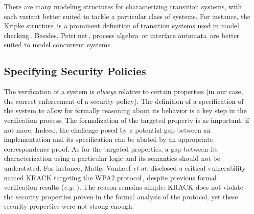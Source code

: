 There are many modeling structures for characterizing transition systems, with
each variant better suited to tackle a particular class of systems.
%
For instance, the Kripke structure\,\cite{kripke1971semantical} is a prominent
definition of transition systems used in model checking\,\cite{clarke1999model}.
%
Besides, Petri net\,\cite{peterson1981petri}, process
algebra\,\cite{bergstra1984process} or interface
automata\,\cite{de2001interface} are better suited to model concurrent systems. 


\subsection{Specifying Security Policies}
\label{subsec:sota:security}

The verification of a system is \emph{always} relative to certain properties (in
our case, the correct enforcement of a security policy).
%
The definition of a specification of the system to allow for formally reasoning
about its behavior is a key step in the verification process.
%
The formalization of the targeted property is as important, if not more.
%
Indeed, the challenge posed by a potential gap between an implementation and its
specification can be abated by an appropriate correspondence proof. 
%
As for the targeted properties, a gap between its characterization using a
particular logic and its semantics should not be understated.
%
For instance, Mathy Vanhoef \emph{et al.} disclosed a critical vulnerability
named KRACK targeting the WPA2 protocol\,\cite{vanhoef2017key}, despite previous
formal verification results (\emph{e.g.} \cite{he2004analysis}).
%
The reason remains simple: KRACK does not violate the security properties proven
in the formal analysis of the protocol, yet these security properties were not
strong enough. 

